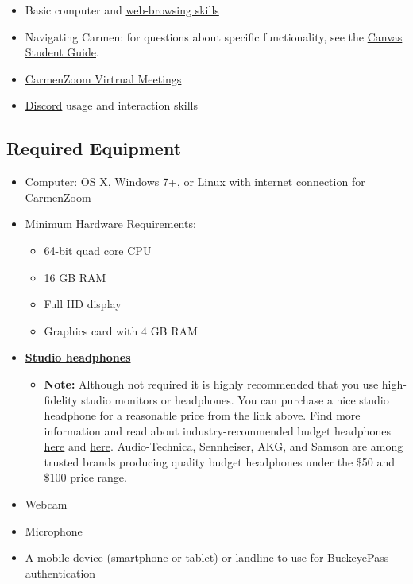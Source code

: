 \begin{itemize}
      \tightlist
      \item Basic computer and \href{https://lmgtfy.com/}{web-browsing skills}
      \item Navigating Carmen: for questions about specific functionality, see the \href{https://community.canvaslms.com/docs/DOC-10701}{Canvas Student Guide}.
      \item \href{https://go.osu.edu/Bqdx}{CarmenZoom Virtrual Meetings}
      \item \href{http://discordapp.com/}{Discord} usage and interaction skills
\end{itemize}

\subsection{Required Equipment}

\begin{itemize}
      \tightlist
      \item Computer: OS X, Windows 7+, or Linux with internet connection for CarmenZoom
      \item Minimum Hardware Requirements:
            \begin{itemize}
                  \item 64-bit quad core CPU
                  \item 16 GB RAM
                  \item Full HD display
                  \item Graphics card with 4 GB RAM
            \end{itemize}
      \item \href{https://amzn.to/2XyXzc9}{\textbf{Studio headphones}}
            \begin{itemize}
                  \item \textbf{Note:} Although not required it is highly recommended that you use high-fidelity studio monitors or headphones. You can purchase a nice studio headphone for a reasonable price from the link above. Find more information and read about industry-recommended budget headphones \href{https://www.gearank.com/guides/cheap-studio-headphones}{here} and \href{https://www.musicradar.com/news/best-budget-studio-headphones}{here}. Audio-Technica, Sennheiser, AKG, and Samson are among trusted brands producing quality budget headphones under the \$50 and \$100 price range.
            \end{itemize}
      \item Webcam
      \item Microphone
      \item A mobile device (smartphone or tablet) or landline to use for BuckeyePass authentication
\end{itemize}

